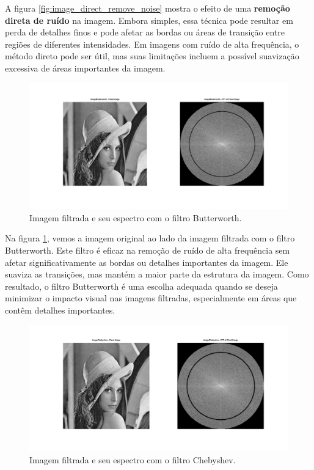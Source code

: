 A figura \ref{fig:image_direct_remove_noise} mostra o efeito de uma \textbf{remoção direta de ruído} na imagem. Embora simples, essa técnica pode resultar em perda de detalhes finos e pode afetar as bordas ou áreas de transição entre regiões de diferentes intensidades. Em imagens com ruído de alta frequência, o método direto pode ser útil, mas suas limitações incluem a possível suavização excessiva de áreas importantes da imagem.

\begin{figure}[H]
    \centering
    \includegraphics[width=1\linewidth]{03_results/assets/image_butterworth.png}
    \caption{Imagem filtrada e seu espectro com o filtro Butterworth.}
    \label{fig:image_butterworth}
\end{figure}

Na figura \ref{fig:image_butterworth}, vemos a imagem original ao lado da imagem filtrada com o filtro Butterworth. Este filtro é eficaz na remoção de ruído de alta frequência sem afetar significativamente as bordas ou detalhes importantes da imagem. Ele suaviza as transições, mas mantém a maior parte da estrutura da imagem. Como resultado, o filtro Butterworth é uma escolha adequada quando se deseja minimizar o impacto visual nas imagens filtradas, especialmente em áreas que contêm detalhes importantes.

\begin{figure}[H]
    \centering
    \includegraphics[width=1\linewidth]{03_results/assets/image_chebyshev.png}
    \caption{Imagem filtrada e seu espectro com o filtro Chebyshev.}
    \label{fig:image_chebyshev}
\end{figure}

